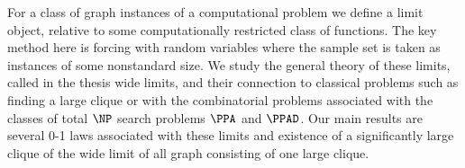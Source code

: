 \documentclass[12pt]{report}
\begin{document}

For a class of graph instances of a computational problem we define a limit object, relative to some computationally restricted class of functions. The key method here is forcing with random variables where the sample set is taken as instances of some nonstandard size. We study the general theory of these limits, called in the thesis wide limits, and their connection to classical problems such as finding a large clique or with the combinatorial problems associated with the classes of total $\NP$ search problems $\PPA$ and $\PPAD$. Our main results are several 0-1 laws associated with these limits and existence of a significantly large clique of the wide limit of all graph consisting of one large clique.
\end{document}
